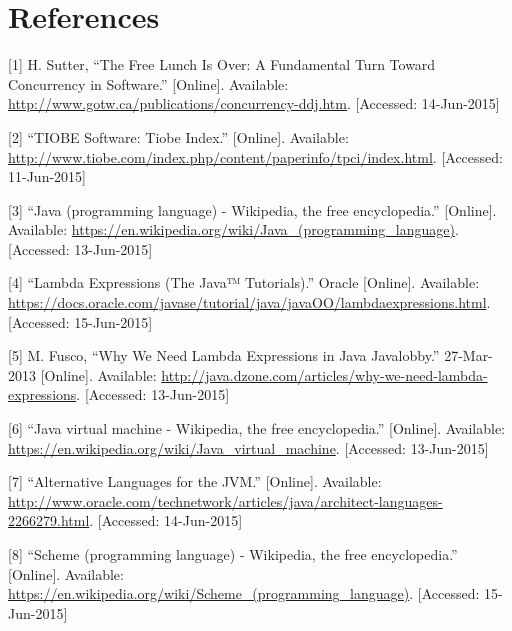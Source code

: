\documentclass[12pt,a4paper,oneside,openright]{book}
\begin{document}
\backmatter

\chapter*{References}\label{references}

{ \setlength{\parskip}{2em}
{[}1{]} H. Sutter, ``The Free Lunch Is Over: A Fundamental Turn Toward
Concurrency in Software.'' {[}Online{]}. Available:
\url{http://www.gotw.ca/publications/concurrency-ddj.htm}. {[}Accessed:
14-Jun-2015{]}

{[}2{]} ``TIOBE Software: Tiobe Index.'' {[}Online{]}. Available:
\url{http://www.tiobe.com/index.php/content/paperinfo/tpci/index.html}.
{[}Accessed: 11-Jun-2015{]}

{[}3{]} ``Java (programming language) - Wikipedia, the free
encyclopedia.'' {[}Online{]}. Available:
\url{https://en.wikipedia.org/wiki/Java_(programming_language)}.
{[}Accessed: 13-Jun-2015{]}

{[}4{]} ``Lambda Expressions (The Java™ Tutorials).'' Oracle
{[}Online{]}. Available:
\url{https://docs.oracle.com/javase/tutorial/java/javaOO/lambdaexpressions.html}.
{[}Accessed: 15-Jun-2015{]}

{[}5{]} M. Fusco, ``Why We Need Lambda Expressions in Java \textbar{}
Javalobby.'' 27-Mar-2013 {[}Online{]}. Available:
\url{http://java.dzone.com/articles/why-we-need-lambda-expressions}.
{[}Accessed: 13-Jun-2015{]}

{[}6{]} ``Java virtual machine - Wikipedia, the free encyclopedia.''
{[}Online{]}. Available:
\url{https://en.wikipedia.org/wiki/Java_virtual_machine}. {[}Accessed:
13-Jun-2015{]}

{[}7{]} ``Alternative Languages for the JVM.'' {[}Online{]}. Available:
\url{http://www.oracle.com/technetwork/articles/java/architect-languages-2266279.html}.
{[}Accessed: 14-Jun-2015{]}

{[}8{]} ``Scheme (programming language) - Wikipedia, the free
encyclopedia.'' {[}Online{]}. Available:
\url{https://en.wikipedia.org/wiki/Scheme_(programming_language)}.
{[}Accessed: 15-Jun-2015{]}

}
\end{document}
